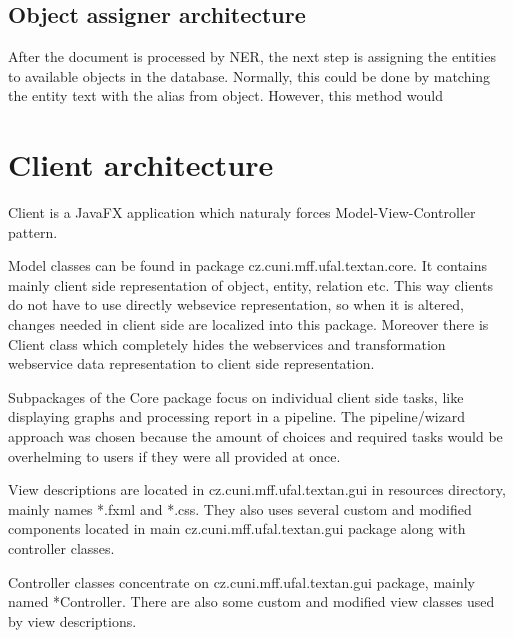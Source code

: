\subsection{Object assigner architecture} 


After the document is processed by NER, the next step is assigning the entities
to available objects in the database. Normally, this could be done by matching
the entity text with the alias from object. However, this method would 


\section{Client architecture}

\textan{} Client is a JavaFX application which naturaly forces Model-View-Controller
pattern.

Model classes can be found in package cz.cuni.mff.ufal.textan.core. It contains
mainly client side representation of object, entity, relation etc. This way
clients do not have to use directly websevice representation, so when it is
altered, changes needed in client side are localized into this package. Moreover
there is Client class which completely hides the webservices and transformation
webservice data representation to client side representation.

Subpackages of the Core package focus on individual client side tasks, like
displaying graphs and processing report in a pipeline. The pipeline/wizard
approach was chosen because the amount of choices and required tasks would
be overhelming to users if they were all provided at once.

View descriptions are located in cz.cuni.mff.ufal.textan.gui in resources
directory, mainly names *.fxml and *.css. They also uses several custom and
modified components located in main cz.cuni.mff.ufal.textan.gui package along
with controller classes.

Controller classes concentrate on cz.cuni.mff.ufal.textan.gui package,
mainly named *Controller. There are also some custom and modified view classes
used by view descriptions.

